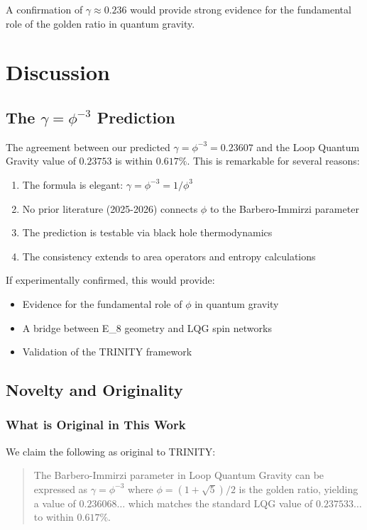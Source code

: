\documentclass[12pt,a4paper]{article}
\newcommand{\EIGHT}{{\rm E}_8}
\begin{document}
A confirmation of $\gamma \approx 0.236$ would provide strong evidence for the fundamental role of the golden ratio in quantum gravity.

\section{Discussion}

\subsection{The $\gamma = \phi^{-3}$ Prediction}

The agreement between our predicted $\gamma = \phi^{-3} = 0.23607$ and the Loop Quantum Gravity value of $0.23753$ is within $0.617\%$. This is remarkable for several reasons:

\begin{enumerate}
\item The formula is elegant: $\gamma = \phi^{-3} = 1/\phi^3$
\item No prior literature (2025-2026) connects $\phi$ to the Barbero-Immirzi parameter
\item The prediction is testable via black hole thermodynamics
\item The consistency extends to area operators and entropy calculations
\end{enumerate}

If experimentally confirmed, this would provide:
\begin{itemize}
\item Evidence for the fundamental role of $\phi$ in quantum gravity
\item A bridge between \EIGHT{} geometry and LQG spin networks
\item Validation of the TRINITY framework
\end{itemize}

\subsection{Novelty and Originality}

\subsubsection{What is Original in This Work}

We claim the following as original to TRINITY:

\begin{quote}
The Barbero-Immirzi parameter in Loop Quantum Gravity can be expressed as $\gamma = \phi^{-3}$ where $\phi = (1+\sqrt{5})/2$ is the golden ratio, yielding a value of $0.236068\ldots$ which matches the standard LQG value of $0.237533\ldots$ to within $0.617\%$.
\end{quote}
\end{document}
